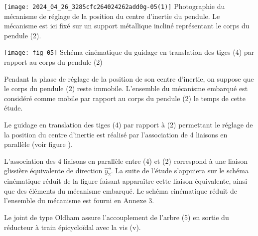 \begin{minipage}[c]{.45\linewidth}
    \texttt{[image: 2024\_04\_26\_3285cfc264024262add0g-05(1)]}
     {\label{ccmp2023_fig_04} Photographie du mécanisme de réglage de la position du centre d'inertie du pendule. Le mécanisme est ici fixé sur un support métallique incliné représentant le corps du pendule (2).}
\end{minipage}
\hfill
\begin{minipage}[c]{.45\linewidth}
        \texttt{[image: fig\_05]}
         {\label{ccmp2023_fig_05} Schéma cinématique du guidage en translation des tiges (4) par rapport au corps du pendule (2)}
\end{minipage}


Pendant la phase de réglage de la position de son centre d'inertie, on suppose que le corps du pendule (2) reste immobile. L'ensemble du mécanisme embarqué est considéré comme mobile par rapport au corps du pendule (2) le temps de cette étude.

Le guidage en translation des tiges (4) par rapport à (2) permettant le réglage de la position du centre d'inertie est réalisé par l'association de 4 liaisons en parallèle (voir figure \label{ccmp2023_fig_05}).




L'association des 4 liaisons en parallèle entre (4) et (2) correspond à une liaison glissière équivalente de direction $\overrightarrow{y_{2}}$. La suite de l'étude s'appuiera sur le schéma cinématique réduit de la figure \label{ccmp2023_fig_06} faisant apparaître cette liaison équivalente, ainsi que des éléments du mécanisme embarqué. Le schéma cinématique réduit de l'ensemble du mécanisme est fourni en Annexe 3.

Le joint de type Oldham assure l'accouplement de l'arbre (5) en sortie du réducteur à train épicycloïdal avec la vis (v).

